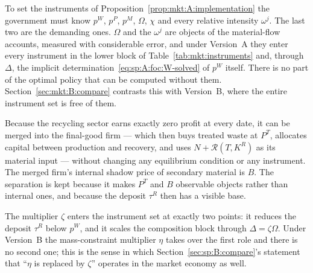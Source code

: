  To set the instruments of
Proposition~\ref{prop:mkt:A:implementation} the government must know $p^W$, $p^P$, $p^M$, $\Omega$,
$\chi$ and every relative intensity $\omega^j$. The last two are the demanding ones. $\Omega$ and the
$\omega^j$ are objects of the material-flow accounts, measured with considerable error, and under
Version~A they enter every instrument in the lower block of Table~\ref{tab:mkt:instruments} and, through
$\Delta$, the implicit determination~\eqref{eq:sp:A:foc:W-solved} of $p^W$ itself. There is no part of
the optimal policy that can be computed without them. Section~\ref{sec:mkt:B:compare} contrasts this
with Version~B, where the entire instrument set is free of them.

\begin{remark}\label{rem:mkt:A:integration}
Because the recycling sector earns exactly zero profit at every date, it can be merged into the
final-good firm --- which then buys treated waste at $P^T$, allocates capital between production and
recovery, and uses $N+\mathcal R\left(T,K^R\right)$ as its material input --- without changing any
equilibrium condition or any instrument. The merged firm's internal shadow price of secondary material
is $B$. The separation is kept because it makes $P^T$ and $B$ observable objects rather than internal
ones, and because the deposit $\tau^R$ then has a visible base.
\end{remark}

\begin{remark}\label{rem:mkt:A:zeta}
The multiplier $\zeta$ enters the instrument set at exactly two points: it reduces the deposit
$\tau^R$ below $p^W$, and it scales the composition block through $\Delta=\zeta\Omega$. Under Version~B
the mass-constraint multiplier $\eta$ takes over the first role and there is no second one; this is the
sense in which Section~\ref{sec:sp:B:compare}'s statement that ``$\eta$ is replaced by $\zeta$''
operates in the market economy as well.
\end{remark}
